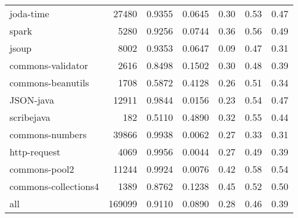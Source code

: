 \begin{table*}
\begin{tabular}{lrrrrrr}
              joda-time &   27480 &          0.9355 &          0.0645 &         0.30 &         0.53 &             0.47 \\
                  spark &    5280 &          0.9256 &          0.0744 &         0.36 &         0.56 &             0.49 \\
                  jsoup &    8002 &          0.9353 &          0.0647 &         0.09 &         0.47 &             0.31 \\
      commons-validator &    2616 &          0.8498 &          0.1502 &         0.30 &         0.48 &             0.39 \\
      commons-beanutils &    1708 &          0.5872 &          0.4128 &         0.26 &         0.51 &             0.34 \\
              JSON-java &   12911 &          0.9844 &          0.0156 &         0.23 &         0.54 &             0.47 \\
             scribejava &     182 &          0.5110 &          0.4890 &         0.32 &         0.55 &             0.44 \\
        commons-numbers &   39866 &          0.9938 &          0.0062 &         0.27 &         0.33 &             0.31 \\
           http-request &    4069 &          0.9956 &          0.0044 &         0.27 &         0.49 &             0.39 \\
          commons-pool2 &   11244 &          0.9924 &          0.0076 &         0.42 &         0.58 &             0.54 \\
   commons-collections4 &    1389 &          0.8762 &          0.1238 &         0.45 &         0.52 &             0.50 \\
                    all &  169099 &          0.9110 &          0.0890 &         0.28 &         0.46 &             0.39 \\
\bottomrule
\end{tabular}
\end{table*}
